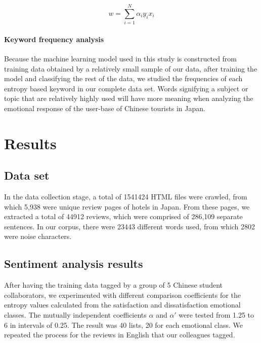 \documentclass[review]{elsarticle}
\newcommand{\myparagraph}[1]{\paragraph{#1}\mbox{}\smallskip}
\begin{document}
\begin{equation}\label{eq:svm_weight}
w = \sum_{i=1}^N \alpha_i y_i x_i
\end{equation}

\myparagraph{Keyword frequency analysis}\label{keywordfrequencyanalysis}

Because the machine learning model used in this study is constructed from training data obtained by a relatively small sample of our data, after training the model and classifying the rest of the data, we studied the frequencies of each entropy based keyword in our complete data set. Words signifying a subject or topic that are relatively highly used will have more meaning when analyzing the emotional response of the user-base of Chinese tourists in Japan.

\section{Results}\label{results}

\subsection{Data set}\label{dataset}

In the data collection stage, a total of \num[group-separator={,}]{1541424} HTML files were crawled, from which 5,938 were unique review pages of hotels in Japan. From these pages, we extracted a total of \num[group-separator={,}]{44912} reviews, which were comprised of 286,109 separate sentences. In our corpus, there were \num[group-separator={,}]{23443} different words used, from which \num[group-separator={,}]{2802} were noise characters.

\subsection{Sentiment analysis results}\label{sentimentresults}

After having the training data tagged by a group of 5 Chinese student collaborators, we experimented with different comparison coefficients for the entropy values calculated from the satisfaction and dissatisfaction emotional classes. The mutually independent coefficients \(\alpha\) and \(\alpha'\) were tested from 1.25 to 6 in intervals of 0.25. The result was 40 lists, 20 for each emotional class. We repeated the process for the reviews in English that our colleagues tagged.
\end{document}
